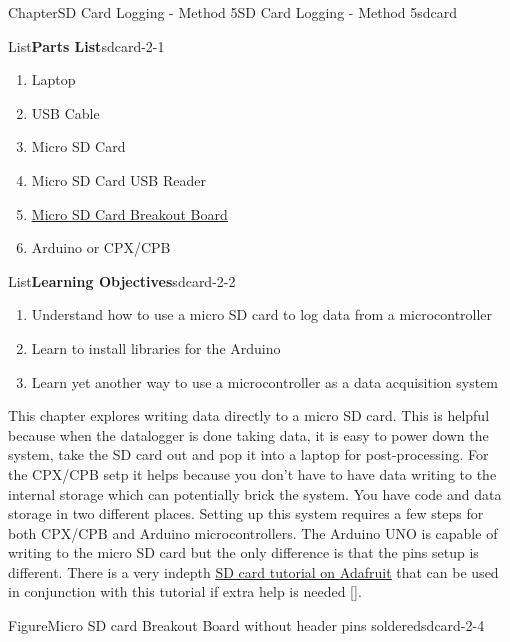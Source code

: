 \documentclass[oneside,10pt,]{book}
\newcommand{\xreffont}{\relax}
\newcommand{\linkhilite}[1]{\underline{#1}}
\numberwithin{equation}{section}
\begin{document}
\begin{chapterptx}{Chapter}{SD Card Logging - Method 5}{}{SD Card Logging - Method 5}{}{}{sdcard}
\renewcommand*{\chaptername}{Chapter}
\begin{introduction}{}%
\begin{listptx}{List}{\textbf{Parts List}}{sdcard-2-1}{}%
%
\begin{enumerate}
\item{}Laptop%
\item{}USB Cable%
\item{}Micro SD Card%
\item{}Micro SD Card USB Reader%
\item{}\href{https://www.adafruit.com/product/254}{\linkhilite{Micro SD Card Breakout Board}}%
\item{}Arduino or CPX\slash{}CPB%
\end{enumerate}
\end{listptx}%
\begin{listptx}{List}{\textbf{Learning Objectives}}{sdcard-2-2}{}%
%
\begin{enumerate}
\item{}Understand how to use a micro SD card to log data from a microcontroller%
\item{}Learn to install libraries for the Arduino%
\item{}Learn yet another way to use a microcontroller as a data acquisition system%
\end{enumerate}
\end{listptx}%
This chapter explores writing data directly to a micro SD card. This is helpful because when the datalogger is done taking data, it is easy to power down the system, take the SD card out and pop it into a laptop for post-processing. For the CPX\slash{}CPB setp it helps because you don't have to have data writing to the internal storage which can potentially brick the system. You have code and data storage in two different places. Setting up this system requires a few steps for both CPX\slash{}CPB and Arduino microcontrollers. The Arduino UNO is capable of writing to the micro SD card but the only difference is that the pins setup is different. There is a very indepth \href{https://learn.adafruit.com/adafruit-micro-sd-breakout-board-card-tutorial}{\linkhilite{SD card tutorial on Adafruit}} that can be used in conjunction with this tutorial if extra help is needed \hyperlink{AdafruitMAIN}{\linkhilite{[{\xreffont 34}]}}.%
\begin{figureptx}{Figure}{Micro SD card Breakout Board without header pins soldered}{sdcard-2-4}{}%

\end{figureptx}
\end{introduction}
\end{chapterptx}
\end{document}
